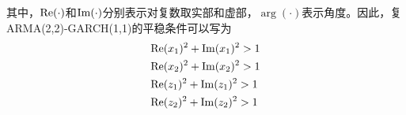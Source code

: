 其中，${\mathop{\rm Re}\nolimits} ( \cdot )$和${\mathop{\rm Im}\nolimits} ( \cdot )$分别表示对复数取实部和虚部，$\arg ( \cdot )$表示角度。因此，复ARMA(2,2)-GARCH(1,1)的平稳条件可以写为
\begin{align}
&{\mathop{\rm Re}\nolimits} {({x_1})^2} + {\mathop{\rm Im}\nolimits} {({x_1})^2} > 1 \label{eq:e11} \\
&{\mathop{\rm Re}\nolimits} {({x_2})^2} + {\mathop{\rm Im}\nolimits} {({x_2})^2} > 1 \label{eq:e12}\\
&{\mathop{\rm Re}\nolimits} {({z_1})^2} + {\mathop{\rm Im}\nolimits} {({z_1})^2} > 1 \label{eq:e13}\\
&{\mathop{\rm Re}\nolimits} {({z_2})^2} + {\mathop{\rm Im}\nolimits} {({z_2})^2} > 1 \label{eq:e14}
\end{align}
